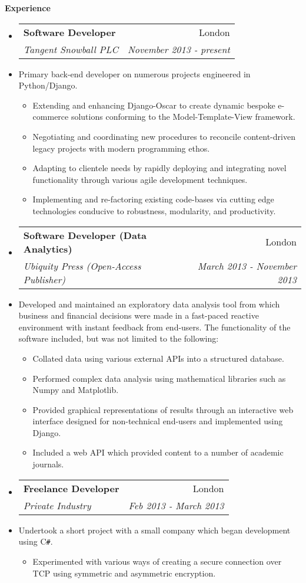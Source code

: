 \documentclass[letterpaper,11pt]{article}
\makeatletter
\newcommand{\resitem}[1]{\item #1 \vspace{-2pt}}
\newcommand{\resheading}[1]{{\large \colorbox{mygrey}
                            {\begin{minipage}{\textwidth}
                            {\textbf{#1 \vphantom{p\^{E}}}}
                            \end{minipage}}}
}
\newcommand{\ressubheading}[4]{
                \begin{tabular*}{180mm}{l@{\extracolsep{\fill}}r}
                \textbf{#1} & #2 \\
                \textit{#3} & \textit{#4} \\
                \end{tabular*}\vspace{-6pt}
}
\newcommand{\resdescription}[1]{#1 \vspace{-0mm}}
\makeatother
\begin{document}
\resheading{Experience}
\begin{itemize}

\item[]
  \ressubheading{Software Developer}{London}{Tangent Snowball PLC}{November 2013 - present}
  \item[]
  \resdescription{Primary back-end developer on numerous  projects engineered in Python/Django.}
  \begin{itemize}
    \resitem{Extending and enhancing Django-Oscar to create dynamic bespoke e-commerce solutions conforming to the Model-Template-View framework.}
    \resitem{Negotiating and coordinating new procedures to reconcile content-driven legacy projects with modern programming ethos.}
    \resitem{Adapting to clientele needs by rapidly deploying and integrating novel functionality through various agile development techniques.}
    \resitem{Implementing and re-factoring existing code-bases via cutting edge technologies conducive to robustness, modularity, and productivity.}
  \end{itemize}

  \item[]
    \ressubheading{Software Developer (Data Analytics)}{London}{Ubiquity Press (Open-Access Publisher)}{March 2013 - November 2013}
    \item[]
     \resdescription{Developed and maintained an exploratory data analysis tool from which business and financial decisions were made in a fast-paced reactive environment with instant feedback from end-users. The functionality of the software included, but was not limited to the following:}
  \begin{itemize}
    \resitem{Collated data using various external APIs into a structured database.}
    \resitem{Performed complex data analysis using mathematical libraries such as Numpy and Matplotlib.}
    \resitem{Provided graphical representations of results through an interactive web interface designed for non-technical end-users and implemented using Django.}
    \resitem{Included a web API which provided content to a number of academic journals.}
  \end{itemize}

  \item[]
  \ressubheading{Freelance Developer}{London}{Private Industry}{Feb 2013 - March 2013}
  \item[]
    \resdescription{Undertook a short project with a small company which began development using C\texttt{\#}.}
    \begin{itemize}
      \resitem{Experimented with various ways of creating a secure connection over TCP using symmetric and asymmetric encryption.}
    \end{itemize}


\end{itemize}
\end{document}
